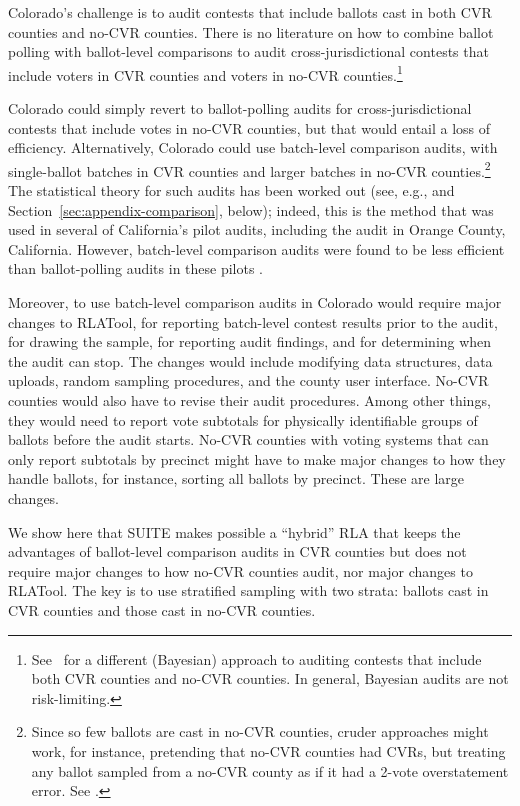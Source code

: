 \documentclass[runningheads]{llncs}
\begin{document}
Colorado's challenge is to audit contests that include ballots cast in both CVR counties and no-CVR counties. There is no literature on how to combine ballot polling with ballot-level comparisons to audit 
cross-jurisdictional contests 
that include voters in CVR counties and voters in no-CVR counties.\footnote{%
  See~\cite{Rivest-2018-bayesian-tabulation-audits}
  for a different (Bayesian) approach to auditing contests that include both CVR counties
  and no-CVR counties. In general, Bayesian audits are not risk-limiting.
}

Colorado could simply revert to ballot-polling audits for cross-jurisdictional contests that include votes in no-CVR counties, but that would entail a loss of efficiency.
Alternatively, Colorado could use batch-level comparison audits, with single-ballot batches in CVR counties and larger batches in no-CVR counties.\footnote{%
Since so few ballots are cast in no-CVR counties, cruder approaches might work, for instance, pretending that no-CVR counties had CVRs, but treating any ballot sampled from a no-CVR county as if it had a 2-vote overstatement error. See \cite{banuelosStark12}.
}
The statistical theory for such audits has been worked out (see, e.g., \cite{stark08a,stark09c,stark09b,stark10d} and Section~\ref{sec:appendix-comparison}, below); indeed, this is the method that was used in several of California's pilot audits, including the audit in Orange County, California.
However, batch-level comparison audits were found to be less efficient than ballot-polling audits in these pilots \cite{CA_SOS_EAC}.

Moreover, to use batch-level comparison audits in Colorado would require major changes to RLATool, for reporting batch-level contest results prior to the audit, for drawing the sample, for reporting audit findings, and for determining when the audit can stop. 
The changes would include modifying data structures, data uploads, random sampling procedures, and the county user interface.
No-CVR counties would also have to revise their audit procedures.
Among other things, they would need to report vote subtotals
for physically identifiable groups of ballots before the audit starts.
No-CVR counties with voting systems that can only report subtotals by precinct
might have to make major changes to how they handle ballots, for instance, sorting all ballots by precinct.
These are large changes.

We show here that SUITE makes possible a ``hybrid'' RLA that keeps the advantages of ballot-level comparison audits in CVR counties but does not require major changes to how no-CVR counties audit, nor major changes to RLATool. 
The key is to use stratified sampling with two strata: ballots cast in CVR counties and those cast in no-CVR counties.
\end{document}
